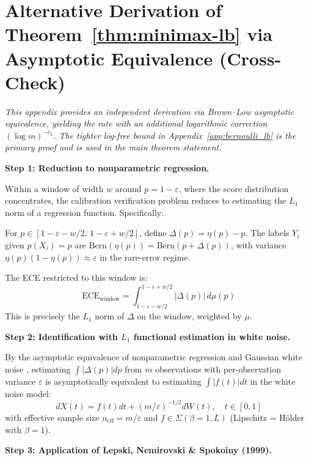 \documentclass{article}
\newcommand{\ECE}{\mathrm{ECE}}
\newcommand{\Lip}{L}
\newcommand{\errrate}{\varepsilon}
\newcommand{\nsamples}{m}
\newcommand{\calmapraw}{\eta}
\newcommand{\calmap}{\Delta}
\newcommand{\scoredist}{\mu}
\newcommand{\Bern}{\mathrm{Bern}}
\theoremstyle{definition}
\begin{document}
\section{Alternative Derivation of Theorem~\ref{thm:minimax-lb} via Asymptotic Equivalence (Cross-Check)}

\emph{This appendix provides an independent derivation via Brown--Low asymptotic equivalence, yielding the rate with an additional logarithmic correction $(\log\nsamples)^{-c_3}$. The tighter log-free bound in Appendix~\ref{app:bernoulli_lb} is the primary proof and is used in the main theorem statement.}
\label{app:minimax-proof}

\textbf{Step 1: Reduction to nonparametric regression.}

Within a window of width $w$ around $p = 1 - \errrate$, where the score distribution concentrates, the calibration verification problem reduces to estimating the $L_1$ norm of a regression function. Specifically:

For $p \in [1-\errrate - w/2, \, 1-\errrate + w/2]$, define $\calmap(p) = \calmapraw(p) - p$. The labels $Y_i$ given $p(X_i) = p$ are $\Bern(\calmapraw(p)) = \Bern(p + \calmap(p))$, with variance $\calmapraw(p)(1 - \calmapraw(p)) \approx \errrate$ in the rare-error regime.

The ECE restricted to this window is:
\begin{equation}
\ECE_{\text{window}} = \int_{1-\errrate-w/2}^{1-\errrate+w/2} |\calmap(p)| \, d\scoredist(p)
\end{equation}
This is precisely the $L_1$ norm of $\calmap$ on the window, weighted by $\scoredist$.

\textbf{Step 2: Identification with $L_1$ functional estimation in white noise.}

By the asymptotic equivalence of nonparametric regression and Gaussian white noise \citep{brown1996equivalence, nussbaum1996equivalence}, estimating $\int |\calmap(p)| dp$ from $\nsamples$ observations with per-observation variance $\errrate$ is asymptotically equivalent to estimating $\int |f(t)| dt$ in the white noise model:
\begin{equation}
dX(t) = f(t) dt + (\nsamples / \errrate)^{-1/2} dW(t), \quad t \in [0,1]
\end{equation}
with effective sample size $n_{\mathrm{eff}} = \nsamples / \errrate$ and $f \in \Sigma(\beta=1, \Lip)$ (Lipschitz = H\"older with $\beta = 1$).

\textbf{Step 3: Application of Lepski, Nemirovski \& Spokoiny (1999).}
\end{document}
